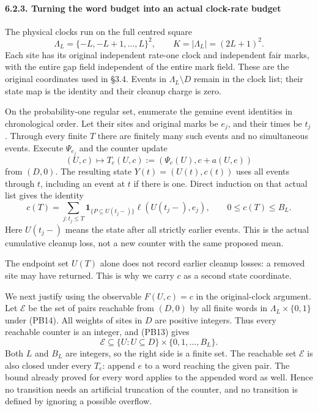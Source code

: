 \documentclass[
  11pt,
  a4paper,
]{article}
\begin{document}
\paragraph{6.2.3. Turning the word budget into an actual clock-rate
budget}\label{turning-the-word-budget-into-an-actual-clock-rate-budget}

The physical clocks run on the full centred square \[
\Lambda_L=\{-L,-L+1,\ldots,L\}^2,\qquad K=|\Lambda_L|=(2L+1)^2.
\] Each site has its original independent rate-one clock and independent
fair marks, with the entire gap field independent of the entire mark
field. These are the original coordinates used in §3.4. Events in
\(\Lambda_L\setminus D\) remain in the clock list; their state map is
the identity and their cleanup charge is zero.

On the probability-one regular set, enumerate the genuine event
identities in chronological order. Let their sites and original marks be
\(e_j\), and their times be \(t_j\). Through every finite \(T\) there
are finitely many such events and no simultaneous events. Execute
\(\Psi_{e_j}\) and the counter update \[
(U,c)\longmapsto
T_e(U,c):=(\Psi_e(U),c+a(U,e))
\tag{PB14}
\] from \((D,0)\). The resulting state \(Y(t)=(U(t),c(t))\) uses all
events through \(t\), including an event at \(t\) if there is one.
Direct induction on that actual list gives the identity \[
c(T)=\sum_{j:t_j\leq T}
\mathbf1_{\{P\subseteq U(t_j-)\}}\ell(U(t_j-),e_j),
\qquad 0\leq c(T)\leq B_L.
\tag{PB15}
\] Here \(U(t_j-)\) means the state after all strictly earlier events.
This is the actual cumulative cleanup loss, not a new counter with the
same proposed mean.

The endpoint set \(U(T)\) alone does not record earlier cleanup losses:
a removed site may have returned. This is why we carry \(c\) as a second
state coordinate.

We next justify using the observable \(F(U,c)=c\) in the original-clock
argument. Let \(\mathcal E\) be the set of pairs reachable from
\((D,0)\) by all finite words in \(\Lambda_L\times\{0,1\}\) under
(PB14). All weights of sites in \(D\) are positive integers. Thus every
reachable counter is an integer, and (PB13) gives \[
\mathcal E\subseteq\{U:U\subseteq D\}\times\{0,1,\ldots,B_L\}.
\tag{PB16}
\] Both \(L\) and \(B_L\) are integers, so the right side is a finite
set. The reachable set \(\mathcal E\) is also closed under every
\(T_e\): append \(e\) to a word reaching the given pair. The bound
already proved for every word applies to the appended word as well.
Hence no transition needs an artificial truncation of the counter, and
no transition is defined by ignoring a possible overflow.
\end{document}
